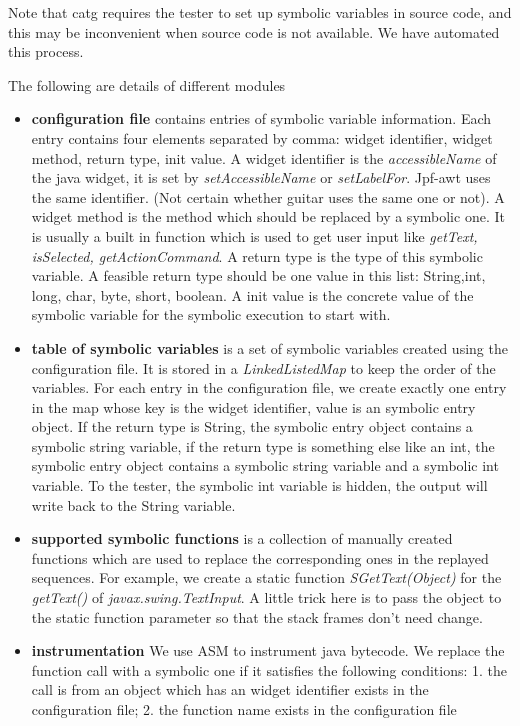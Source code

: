 \documentclass[blind]{sig-alternate-05-2015}
\begin{document}
Note that catg requires the tester to set up symbolic variables in source code, and this may be inconvenient when source code is not available. We have automated this process.

The following are details of different modules
\begin{itemize}
  \item{\textbf{configuration file} contains entries of symbolic variable information. Each entry contains four elements separated by comma: widget identifier, widget method, return type, init value. A widget identifier is the \textit{accessibleName} of the java widget, it is set by \textit{setAccessibleName} or \textit{setLabelFor}. Jpf-awt uses the same identifier. (Not certain whether guitar uses the same one or not)}. A widget method is the method which should be replaced by a symbolic one. It is usually a built in function which is used to get user input like \textit{getText, isSelected, getActionCommand}. A return type is the type of this symbolic variable. A feasible return type should be one value in this list: {String,int, long, char, byte, short, boolean}. A init value is the concrete value of the symbolic variable for the symbolic execution to start with.

  \item{\textbf{table of symbolic variables}} is a set of symbolic variables created using the configuration file. It is stored in a \textit{LinkedListedMap} to keep the order of the variables. For each entry in the configuration file, we create exactly one entry in the map whose key is the widget identifier, value is an symbolic entry object. If the return type is String, the symbolic entry object contains a symbolic string variable, if the return type is something else like an int, the symbolic entry object contains a symbolic string variable and a symbolic int variable. To the tester, the symbolic int variable is hidden, the output will write back to the String variable.

  \item{\textbf{supported symbolic functions}} is a collection of manually created functions which are used to replace the corresponding ones in the replayed sequences. For example, we create a static function \textit{SGetText(Object)} for the \textit{getText()} of \textit{javax.swing.TextInput}. A little trick here is to pass the object  to the static function parameter so that the stack frames don't need change.

  \item{\textbf{instrumentation} We use ASM to instrument java bytecode. We replace the function call with a symbolic one if it satisfies the following conditions: 1. the call is from an object which has an widget identifier exists in the configuration file; 2. the function name exists in the configuration file}


\end{itemize}
\end{document}
